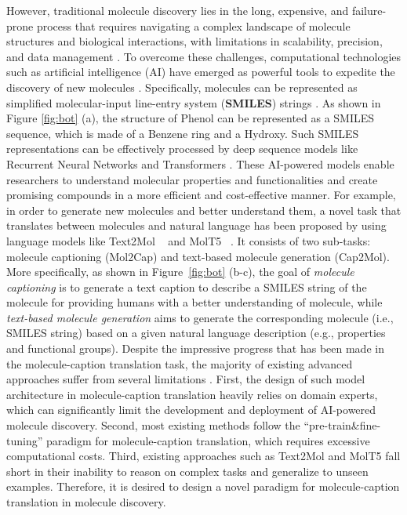 \documentclass{article}
\theoremstyle{plain}
\theoremstyle{definition}
\theoremstyle{remark}
\begin{document}
However, traditional molecule discovery lies in the long, expensive, and failure-prone process that requires navigating a complex landscape of molecule structures and biological interactions, with limitations in scalability, precision, and data management \cite{hajduk2007decade}.
To overcome these challenges, computational technologies such as artificial intelligence (AI) have emerged as powerful tools to expedite the discovery of new molecules \cite{urbina2022commoditization}. 
Specifically, molecules can be represented as simplified molecular-input line-entry system (\textbf{SMILES}) strings \cite{weininger1988smiles,cao2022identifying}. As shown in Figure \ref{fig:bot} (a), the structure of Phenol can be represented as a SMILES sequence, which is made of a Benzene ring and a Hydroxy. 
Such SMILES representations can be effectively processed by deep sequence models like Recurrent Neural Networks \cite{arus2019randomized,grisoni2020bidirectional} and Transformers \cite{honda2019smiles,yoshikai2023difficulty}.
These AI-powered models enable researchers to understand molecular properties and functionalities and create promising compounds in a more efficient and cost-effective manner. 
For example, in order to generate new molecules and better understand them, a novel task that translates between molecules and natural language has been proposed by using language models like Text2Mol ~\cite{edwards2021text2mol} and MolT5 ~\cite{edwards-etal-2022-translation}. It consists of two sub-tasks: molecule captioning (Mol2Cap) and text-based molecule generation (Cap2Mol). 
More specifically, as shown in Figure~\ref{fig:bot} (b-c), the goal of \emph{molecule captioning} is to generate a text caption to describe a SMILES string of the molecule for providing humans with a better understanding of molecule, while \emph{text-based molecule generation} aims to generate the corresponding molecule (i.e., SMILES string) based on a given natural language description (e.g., properties and functional groups).
Despite the impressive progress that has been made in the molecule-caption translation task, the majority of existing advanced approaches suffer from several limitations \cite{edwards2021text2mol, edwards-etal-2022-translation, su2022molecular}.
First, the design of such model architecture in molecule-caption translation heavily relies on domain experts, which can significantly limit the development and deployment of AI-powered molecule discovery. Second, most existing methods follow the ``pre-train\&fine-tuning'' paradigm for molecule-caption translation, which requires excessive computational costs.
Third, existing approaches such as Text2Mol and MolT5 fall short in their inability to reason on complex tasks and generalize to unseen examples. Therefore, it is desired to design a novel paradigm for molecule-caption translation in molecule discovery.
\end{document}
